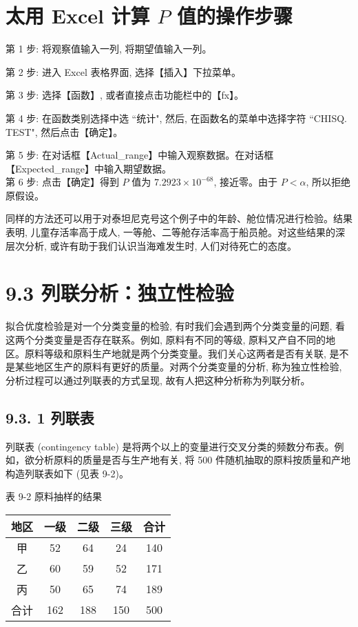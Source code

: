 \documentclass[10pt]{article}
\begin{document}
\begin{CJK*}{UTF8}{bsmi}
\section*{太用 Excel 计算 $P$ 值的操作步骤}
第 1 步: 将观察值输入一列, 将期望值输入一列。

第 2 步: 进入 Excel 表格界面, 选择【插入】下拉菜单。

第 3 步: 选择【函数】, 或者直接点击功能栏中的【fx】。

第 4 步: 在函数类别选择中选 “统计", 然后, 在函数名的菜单中选择字符 “CHISQ. TEST", 然后点击【确定】。

第 5 步: 在对话框【Actual\_range】中输入观察数据。在对话框【Expected\_range】中输入期望数据。\\
第 6 步: 点击【确定】得到 $P$ 值为 $7.2923 \times 10^{-68}$, 接近零。由于 $P<\alpha$, 所以拒绝原假设。

同样的方法还可以用于对泰坦尼克号这个例子中的年龄、舱位情况进行检验。结果表明, 儿童存活率高于成人, 一等舱、二等舱存活率高于船员舱。对这些结果的深层次分析, 或许有助于我们认识当海难发生时, 人们对待死亡的态度。

\section*{9.3 列联分析：独立性检验}
拟合优度检验是对一个分类变量的检验, 有时我们会遇到两个分类变量的问题, 看这两个分类变量是否存在联系。例如, 原料有不同的等级, 原料又产自不同的地区。原料等级和原料生产地就是两个分类变量。我们关心这两者是否有关联, 是不是某些地区生产的原料有更好的质量。对两个分类变量的分析, 称为独立性检验, 分析过程可以通过列联表的方式呈现, 故有人把这种分析称为列联分析。

\subsection*{9.3. 1 列联表}
列联表 (contingency table) 是将两个以上的变量进行交叉分类的频数分布表。例如，欲分析原料的质量是否与生产地有关, 将 500 件随机抽取的原料按质量和产地构造列联表如下 (见表 9-2)。

表 9-2 原料抽样的结果

\begin{center}
\begin{tabular}{ccccc}
\hline
地区 & 一级 & 二级 & 三级 & 合计 \\
\hline
甲 & 52 & 64 & 24 & 140 \\
乙 & 60 & 59 & 52 & 171 \\
丙 & 50 & 65 & 74 & 189 \\
\hline
合计 & 162 & 188 & 150 & 500 \\
\hline
\end{tabular}
\end{center}


\end{CJK*}
\end{document}
